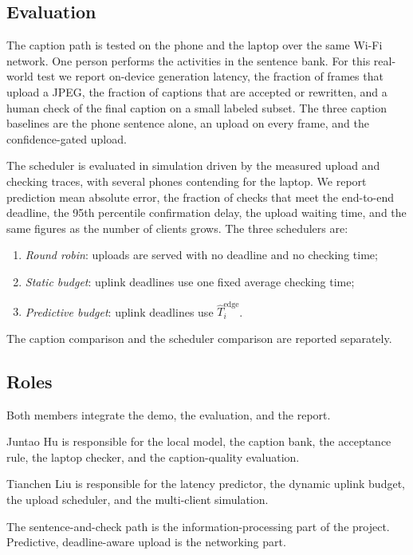 \subsection{Evaluation}

The caption path is tested on the phone and the laptop over the same Wi-Fi
network. One person performs the activities in the sentence bank. For this
real-world test we report on-device generation latency, the fraction of
frames that upload a JPEG, the fraction of captions that are accepted or
rewritten, and a human check of the final caption on a small labeled
subset. The three caption baselines are the phone sentence alone, an upload
on every frame, and the confidence-gated upload.

The scheduler is evaluated in simulation driven by the measured upload and
checking traces, with several phones contending for the laptop. We report
prediction mean absolute error, the fraction of checks that meet the
end-to-end deadline, the 95th percentile confirmation delay, the upload
waiting time, and the same figures as the number of clients grows. The
three schedulers are:
\begin{enumerate}
\item \emph{Round robin}: uploads are served with no deadline and no
checking time;
\item \emph{Static budget}: uplink deadlines use one fixed average checking
time;
\item \emph{Predictive budget}: uplink deadlines use
$\hat T_i^{\mathrm{edge}}$.
\end{enumerate}
The caption comparison and the scheduler comparison are reported
separately.

\subsection{Roles}

Both members integrate the demo, the evaluation, and the report.

Juntao Hu is responsible for the local model, the caption bank, the
acceptance rule, the laptop checker, and the caption-quality evaluation.

Tianchen Liu is responsible for the latency predictor, the dynamic uplink
budget, the upload scheduler, and the multi-client simulation.

The sentence-and-check path is the information-processing part of the
project. Predictive, deadline-aware upload is the networking part.